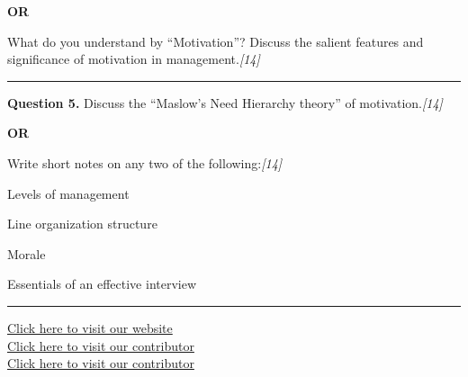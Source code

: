 \documentclass[11pt,a4paper]{article}
\newcommand{\pts}[1]{\hfill   \textit{[#1]}}
\begin{document}
\centerline{   \textbf{OR}}

What do you understand by ``Motivation''? Discuss the salient features and significance of motivation in management.\pts{14}

\medskip\rule{\linewidth}{0.2pt}




\noindent   \textbf{Question 5.}
Discuss the ``Maslow's Need Hierarchy theory'' of motivation.\pts{14}

\centerline{   \textbf{OR}}

Write short notes on any two of the following:\pts{14}

\begin{parts}
  \item Levels of management
  \item Line organization structure
  \item Morale
  \item Essentials of an effective interview
\end{parts}

\vfill
\rule{\linewidth}{0.4pt}

\begin{center}\small
\href{https://bhu-exam.vercel.app/}{Click here to visit our website}\\[4pt]
\href{https://me-aryan.vercel.app/}{Click here to visit our contributor}\\[4pt]
\href{https://quashan-me.vercel.app/}{Click here to visit our contributor}
\end{center}
\end{document}
